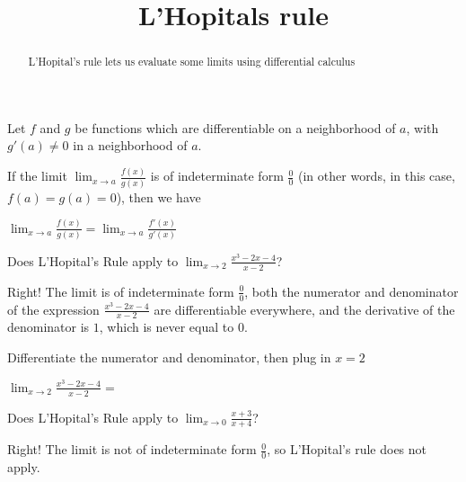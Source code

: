 \documentclass{ximera}
\title{L'Hopitals rule}
\begin{document}
\begin{abstract}
   L'Hopital's rule lets us evaluate some limits using differential calculus  
\end{abstract}

\maketitle

\begin{theorem}
	Let $f$ and $g$ be functions which are differentiable on a neighborhood of $a$, with $g'(a) \neq 0$ in a neighborhood of $a$. 

	If the limit $\displaystyle\lim_{x \to a} \frac{f(x)}{g(x)}$ is of indeterminate form $\frac{0}{0}$ (in other words, in this case, $f(a) = g(a)=0$), then we have
	
	$\displaystyle\lim_{x \to a} \frac{f(x)}{g(x)} = \displaystyle\lim_{x \to a} \frac{f'(x)}{g'(x)}$
\end{theorem}

\begin{question}
  Does L'Hopital's Rule apply to $\lim_{x \to 2}\frac{x^3-2x-4}{x-2}$?
  
  \begin{solution}
 \begin{multipleChoice}
    \end{multipleChoice}
 \end{solution}
 
 Right! The limit is of indeterminate form $\frac{0}{0}$, both the numerator and denominator of the expression $\frac{x^3-2x-4}{x-2}$ are differentiable everywhere, and the derivative of the denominator is $1$, which is never equal to $0$.
 
 \end{question}
 
 \begin{question}
 	\begin{hint}
		Differentiate the numerator and denominator, then plug in $x=2$
	\end{hint}
  	 $\lim_{x \to 2}\frac{x^3-2x-4}{x-2}=$
  \end{question}
  
\begin{question}
  Does L'Hopital's Rule apply to $\lim_{x \to 0}\frac{x+3}{x+4}$?
  
  \begin{solution}
 \begin{multipleChoice}
    \end{multipleChoice}
 \end{solution}
 
 Right! The limit is not of indeterminate form $\frac{0}{0}$, so L'Hopital's rule does not apply.
 
 \end{question}
 
\end{document}
